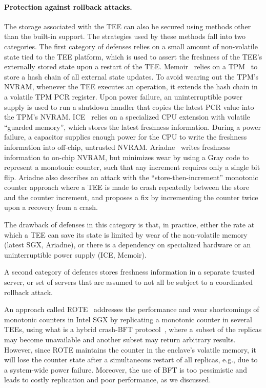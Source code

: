 \paragraph{Protection against rollback attacks.}
The storage associated with the TEE can also be secured using
methods other than the built-in support. The strategies used by
these methods fall into two categories. The first category of
defenses relies on a small amount of non-volatile state tied to
the TEE platform, which is used to assert the freshness of the
TEE's externally stored state upon a restart of the TEE.
Memoir~\cite{memoir} relies on a TPM~\cite{tpm} to store a hash
chain of all external state updates.  To avoid wearing out the
TPM's NVRAM, whenever the TEE executes an operation, it extends
the hash chain in a volatile TPM PCR register. Upon power
failure, an uninterruptible power supply is used to run a
shutdown handler that copies the latest PCR value into the TPM's
NVRAM.  ICE~\cite{ice} relies on a specialized CPU extension with
volatile ``guarded memory'', which stores the latest freshness
information. During a power failure, a capacitor supplies enough
power for the CPU to write the freshness information into
off-chip, untrusted NVRAM. Ariadne~\cite{ariadne} writes
freshness information to on-chip NVRAM, but minimizes wear by
using a Gray code to represent a monotonic counter, such that any
increment requires only a single bit flip. Ariadne also describes
an attack with the ``store-then-increment'' monotonic counter
approach where a TEE is made to crash repeatedly between the
store and the counter increment, and proposes a fix by
incrementing the counter twice upon a recovery from a crash.

The drawback of defenses in this category is that, in practice,
either the rate at which a TEE can save its state is limited by
wear of the non-volatile memory (latest SGX, Ariadne), or there
is a dependency on specialized hardware or an uninterruptible
power supply (ICE, Memoir).

A second category of defenses stores freshness information in a
separate trusted server, or set of servers that are assumed to
not all be subject to a coordinated rollback attack.

An approach called ROTE~\cite{rote} addresses the performance and
wear shortcomings of monotonic counters in Intel SGX by
replicating a monotonic counter in several TEEs, using what is a
hybrid crash-BFT protocol~\cite{MeyerPradhan91, upright}, where a
subset of the replicas may become unavailable and another subset
may return arbitrary results. However, since ROTE maintains the
counter in the enclave's volatile memory, it will lose the
counter state after a simultaneous restart of all replicas, e.g.,
due to a system-wide power failure. Moreover, the use of BFT is
too pessimistic and leads to costly replication and poor
performance, as we discussed.

